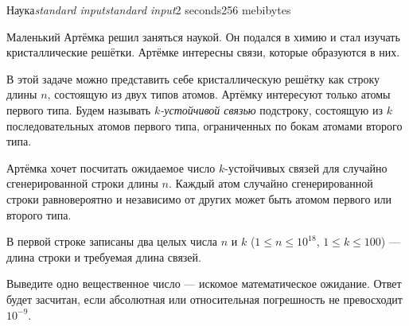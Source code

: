 \begin{problem}{Наука}{\textsl{standard input}}{\textsl{standard input}}{2 seconds}{256 mebibytes}{}

Маленький Артёмка решил заняться наукой. Он подался в химию и стал изучать кристаллические решётки. Артёмке интересны связи, которые образуются в них. 

В этой задаче можно представить себе кристаллическую решётку как строку длины $n$, состоящую из двух типов атомов. Артёмку интересуют только атомы первого типа. Будем называть \textit{$k$-устойчивой связью} подстроку, состоящую из $k$ последовательных атомов первого типа, ограниченных по бокам атомами второго типа.

Артёмка хочет посчитать ожидаемое число $k$-устойчивых связей для случайно сгенерированной строки длины $n$. Каждый атом случайно сгенерированной строки равновероятно и независимо от других может быть атомом первого или второго типа.

\InputFile
В первой строке записаны два целых числа $n$ и $k$ ($1 \le n \le 10^{18}$, $1 \le k \le 100$) --- длина строки и требуемая длина связей.

\OutputFile
Выведите одно вещественное число --- искомое математическое ожидание. Ответ будет засчитан, если абсолютная или относительная погрешность не превосходит $10^{-9}$.

\Examples

\begin{example}
%
%
%
\end{example}

\end{problem}
